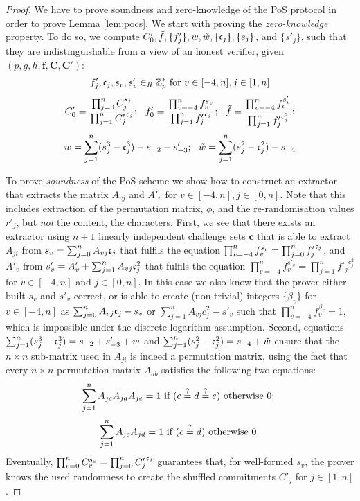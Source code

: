 \begin{proof}
We have to prove soundness and zero-knowledge of the \ac{PoS} protocol in order to prove Lemma \ref{lem:pocs}.
We start with proving the \emph{zero-knowledge} property.
To do so, we compute $C'_0, \tilde{f}, \{f'_j\}, w, \tilde{w}, \{\mathfrak{c}_j\}, \{s_j\}$, and $\{s'_j\}$, such that they are indistinguishable from a view of an honest verifier, given $(p,g,h,\bm f, \bm C, \bm C')$:
  \[
    f'_j, \mathfrak{c}_j, s_v, s'_v \in_R \mathbb{Z}^\ast_p \text{ for } v\in[-4,n], j\in[1,n]
  \]
  \[
    C'_0 = \frac{\prod_{j=0}^n C_j^{s_j}}{\prod_{j=1}^n {C'_j}^{\mathfrak{c}_j}};~~
    f'_0 = \frac{\prod_{v=-4}^n f_v^{s_v}}{\prod_{j=1}^n {f'_j}^{\mathfrak{c}_j}};~~
    \tilde{f} = \frac{\prod_{v=-4}^n f_v^{s'_v}}{\prod_{j=1}^n {f'_j}^{c^2_j}};
  \]
  \[
    w = \sum_{j=1}^n (s_j^3 - \mathfrak{c}_j^3) - s_{-2} - s'_{-3};~~
    \tilde{w} = \sum_{j=1}^n (s_j^2 - \mathfrak{c}_j^2) - s_{-4}
  \]

\noindent
To prove \emph{soundness} of the \ac{PoS} scheme we show how to construct an extractor \Ext that extracts the matrix $A_{vj}$ and $A'_v$ for $v\in[-4,n], j\in[0,n]$.
  Note that this includes extraction of the permutation matrix, \ie $\phi$, and the re-randomisation values $r'_j$, but \emph{not} the content, \ie the characters.
  First, we see that there exists an extractor \Ext using $n+1$ linearly independent challenge sets $\bm c$ that is able to extract $A_{ji}$ from $s_v=\sum_{j=0}^n A_{vj}\mathfrak{c}_j$ that fulfils the equation $\prod_{v=-4}^n f_v^{s_v}=\prod_{j=0}^n {f'_j}^{\mathfrak{c}_j}$, and $A'_v$ from $s'_v=A'_v + \sum_{j=1}^n A_{vj}\mathfrak{c}_j^2$ that fulfils the equation $\prod_{v=-4}^n f_v^{s'_v}=\prod_{j=1}^n {f'_j}^{c^2_j}$ for $v\in[-4,n]$ and $j\in[0,n]$.
  In this case we also know that the prover either built $s_v$ and $s'_v$ correct, or is able to create (non-trivial) integers $\{\beta_v\}$ for $v\in[-4,n]$ as $\sum_{j=0}^n A_{vj}\mathfrak{c}_j - s_v$ or $\sum_{j=1}^n A_{vj}c^2_j - s'_v$ such that $\prod_{v=-4}^n f_v^{\beta_v} = 1$, which is impossible under the discrete logarithm assumption.
  Second, equations $\sum_{j=1}^n (s_j^3 - \mathfrak{c}_j^3)=s_{-2} + s'_{-3} + w$ and $\sum_{j=1}^n (s_j^2 - \mathfrak{c}_j^2)= s_{-4} + \tilde{w}$ ensure that the $n\times n$ sub-matrix used in $A_{ji}$ is indeed a permutation matrix, using the fact that every $n\times n$ permutation matrix $A_{ab}$ satisfies the following two equations:
  \[
    \sum_{j=1}^n A_{jc} A_{jd} A_{je} = 1 \text{ if } (c\stackrel{?}{=} d\stackrel{?}{=} e) \text{ otherwise } 0; ~
  \]
  \[
    \sum_{j=1}^n A_{jc} A_{jd} = 1 \text{ if } (c\stackrel{?}{=} d) \text{ otherwise } 0.
  \]
  Eventually, $\prod_{v=0}^n C_v^{s_v}=\prod_{j=0}^n {C'_j}^{\mathfrak{c}_j}$ guarantees that, for well-formed $s_v$, the prover knows the used randomness to create the shuffled commitments $C'_j$ for $j\in[1,n]$.
\end{proof}

